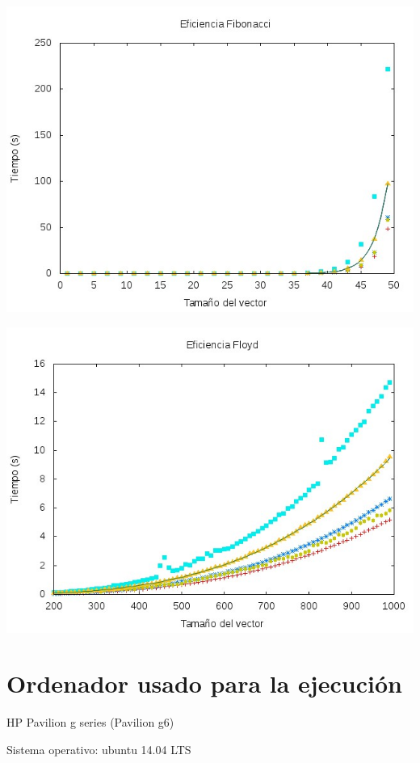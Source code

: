 \documentclass[11pt,spanish]{article} %
\begin{document}
\begin{center}
\includegraphics[scale=0.55]{../Graficas/Fibonacci/total_Fibonacci.jpeg}
\end{center}

\begin{center}
\includegraphics[scale=0.55]{../Graficas/Floyd/total_Floyd.jpeg}
\end{center}

\section{Ordenador usado para la ejecuci\'on}
HP Pavilion g series (Pavilion g6)

Sistema operativo: ubuntu 14.04 LTS
\end{document}
